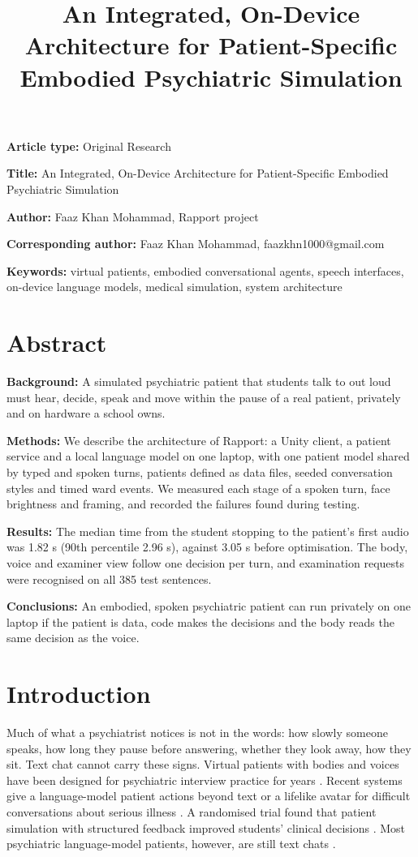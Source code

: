 \documentclass{article}
\title{An Integrated, On-Device Architecture for Patient-Specific Embodied Psychiatric Simulation}
\begin{document}
\maketitle
\textbf{Article type:} Original Research

\textbf{Title:} An Integrated, On-Device Architecture for Patient-Specific Embodied Psychiatric Simulation

\textbf{Author:} Faaz Khan Mohammad, Rapport project

\textbf{Corresponding author:} Faaz Khan Mohammad, faazkhn1000@gmail.com

\textbf{Keywords:} virtual patients, embodied conversational agents, speech interfaces, on-device language models, medical simulation, system architecture

\section*{Abstract}
\textbf{Background:} A simulated psychiatric patient that students talk to out loud must hear, decide, speak and move within the pause of a real patient, privately and on hardware a school owns.

\textbf{Methods:} We describe the architecture of Rapport: a Unity client, a patient service and a local language model on one laptop, with one patient model shared by typed and spoken turns, patients defined as data files, seeded conversation styles and timed ward events. We measured each stage of a spoken turn, face brightness and framing, and recorded the failures found during testing.

\textbf{Results:} The median time from the student stopping to the patient's first audio was 1.82 s (90th percentile 2.96 s), against 3.05 s before optimisation. The body, voice and examiner view follow one decision per turn, and examination requests were recognised on all 385 test sentences.

\textbf{Conclusions:} An embodied, spoken psychiatric patient can run privately on one laptop if the patient is data, code makes the decisions and the body reads the same decision as the voice.

\section{Introduction}
Much of what a psychiatrist notices is not in the words: how slowly someone speaks, how long they pause before answering, whether they look
away, how they sit. Text chat cannot carry these signs. Virtual patients with bodies and voices have been designed for psychiatric interview
practice for years \cite{dupuy2020guidelines}. Recent systems give a language-model patient actions beyond text \cite{voigt2025llmpowered} or a lifelike avatar for difficult conversations about serious illness \cite{haut2025ai}. A randomised trial found that patient simulation with structured feedback improved students' clinical decisions \cite{brugge2024llm}. Most psychiatric language-model patients, however, are still
text chats \cite{wang2024patient,lee2025psyche,sabour2026patientact}.
\end{document}
